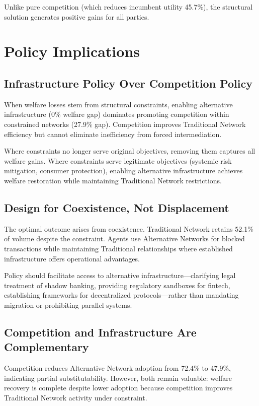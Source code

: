 Unlike pure competition (which reduces incumbent utility 45.7\%), the structural solution generates positive gains for all parties.

\section{Policy Implications}

\subsection{Infrastructure Policy Over Competition Policy}

When welfare losses stem from structural constraints, enabling alternative infrastructure (0\% welfare gap) dominates promoting competition within constrained networks (27.9\% gap). Competition improves Traditional Network efficiency but cannot eliminate inefficiency from forced intermediation.

Where constraints no longer serve original objectives, removing them captures all welfare gains. Where constraints serve legitimate objectives (systemic risk mitigation, consumer protection), enabling alternative infrastructure achieves welfare restoration while maintaining Traditional Network restrictions.

\subsection{Design for Coexistence, Not Displacement}

The optimal outcome arises from coexistence. Traditional Network retains 52.1\% of volume despite the constraint. Agents use Alternative Networks for blocked transactions while maintaining Traditional relationships where established infrastructure offers operational advantages.

Policy should facilitate access to alternative infrastructure—clarifying legal treatment of shadow banking, providing regulatory sandboxes for fintech, establishing frameworks for decentralized protocols—rather than mandating migration or prohibiting parallel systems.

\subsection{Competition and Infrastructure Are Complementary}

Competition reduces Alternative Network adoption from 72.4\% to 47.9\%, indicating partial substitutability. However, both remain valuable: welfare recovery is complete despite lower adoption because competition improves Traditional Network activity under constraint.

